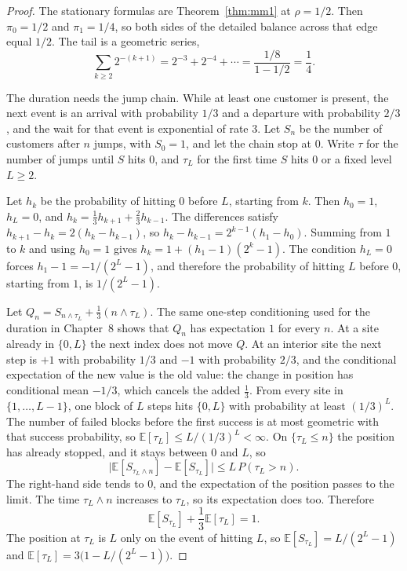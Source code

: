 \begin{proof}
The stationary formulas are Theorem~\ref{thm:mm1} at $\rho=1/2$. Then $\pi_0=1/2$ and $\pi_1=1/4$, so both sides of the detailed balance across that edge equal $1/2$. The tail is a geometric series,
\[
 \sum_{k\ge2}2^{-(k+1)}=2^{-3}+2^{-4}+\cdots=\frac{1/8}{1-1/2}=\frac14.
\]

The duration needs the jump chain. While at least one customer is present, the next event is an arrival with probability $1/3$ and a departure with probability $2/3$, and the wait for that event is exponential of rate $3$. Let $S_n$ be the number of customers after $n$ jumps, with $S_0=1$, and let the chain stop at $0$. Write $\tau$ for the number of jumps until $S$ hits $0$, and $\tau_L$ for the first time $S$ hits $0$ or a fixed level $L\ge2$.

Let $h_k$ be the probability of hitting $0$ before $L$, starting from $k$. Then $h_0=1$, $h_L=0$, and $h_k=\frac13 h_{k+1}+\frac23 h_{k-1}$. The differences satisfy $h_{k+1}-h_k=2(h_k-h_{k-1})$, so $h_k-h_{k-1}=2^{k-1}(h_1-h_0)$. Summing from $1$ to $k$ and using $h_0=1$ gives $h_k=1+(h_1-1)(2^k-1)$. The condition $h_L=0$ forces $h_1-1=-1/(2^L-1)$, and therefore the probability of hitting $L$ before $0$, starting from $1$, is $1/(2^L-1)$.

Let $Q_n=S_{n\wedge\tau_L}+\frac13(n\wedge\tau_L)$. The same one-step conditioning used for the duration in Chapter~8 shows that $Q_n$ has expectation $1$ for every $n$. At a site already in $\{0,L\}$ the next index does not move $Q$. At an interior site the next step is $+1$ with probability $1/3$ and $-1$ with probability $2/3$, and the conditional expectation of the new value is the old value: the change in position has conditional mean $-1/3$, which cancels the added $\frac13$. From every site in $\{1,\ldots,L-1\}$, one block of $L$ steps hits $\{0,L\}$ with probability at least $(1/3)^L$. The number of failed blocks before the first success is at most geometric with that success probability, so $\mathbb E[\tau_L]\le L/(1/3)^L<\infty$. On $\{\tau_L\le n\}$ the position has already stopped, and it stays between $0$ and $L$, so
\[
 \bigl|\mathbb E[S_{\tau_L\wedge n}]-\mathbb E[S_{\tau_L}]\bigr|\le L\,P(\tau_L>n).
\]
The right-hand side tends to $0$, and the expectation of the position passes to the limit. The time $\tau_L\wedge n$ increases to $\tau_L$, so its expectation does too. Therefore
\[
 \mathbb E[S_{\tau_L}]+\frac13\mathbb E[\tau_L]=1.
\]
The position at $\tau_L$ is $L$ only on the event of hitting $L$, so $\mathbb E[S_{\tau_L}]=L/(2^L-1)$ and $\mathbb E[\tau_L]=3\bigl(1-L/(2^L-1)\bigr)$.


\end{proof}
